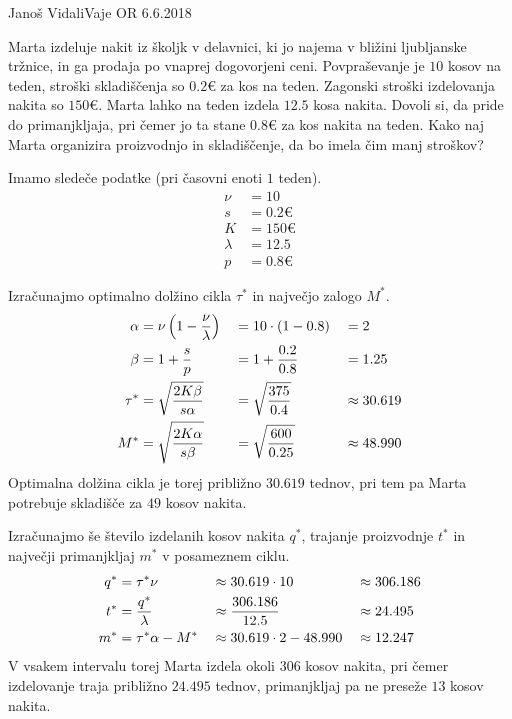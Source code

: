 \begin{naloga}{Janoš Vidali}{Vaje OR 6.6.2018}
\begin{vprasanje}
Marta izdeluje nakit iz školjk v delavnici,
ki jo najema v bližini ljubljanske tržnice,
in ga prodaja po vnaprej dogovorjeni ceni.
Povpraševanje je $10$ kosov na teden,
stroški skladiščenja so $0.2 €$ za kos na teden.
Zagonski stroški izdelovanja nakita so $150 €$.
Marta lahko na teden izdela $12.5$ kosa nakita.
Dovoli si, da pride do primanjkljaja,
pri čemer jo ta stane $0.8 €$ za kos nakita na teden.
Kako naj Marta organizira proizvodnjo in skladiščenje,
da bo imela čim manj stroškov?
\end{vprasanje}

\begin{odgovor}
Imamo sledeče podatke (pri časovni enoti $1$ teden).
\begin{align*}
\nu &= 10 \\
s &= 0.2 € \\
K &= 150 € \\
\lambda &= 12.5 \\
p &= 0.8 €
\end{align*}

Izračunajmo optimalno dolžino cikla $\tau^*$
in največjo zalogo $M^*$.
\begin{alignat*}{3}
\alpha &= \nu \left(1 - {\nu \over \lambda}\right)
&&= 10 \cdot (1 - 0.8) &&= 2 \\
\beta &= 1 + {s \over p}
&&= 1 + {0.2 \over 0.8} &&= 1.25 \\
\tau^* &= \sqrt{2K \beta \over s \alpha}
&&= \sqrt{375 \over 0.4} &&\approx 30.619 \\
M^* &= \sqrt{2K \alpha \over s \beta}
&&= \sqrt{600 \over 0.25} &&\approx 48.990
\end{alignat*}
Optimalna dolžina cikla je torej približno $30.619$ tednov,
pri tem pa Marta potrebuje skladišče za $49$ kosov nakita.

Izračunajmo še število izdelanih kosov nakita $q^*$,
trajanje proizvodnje $t^*$ in največji primanjkljaj $m^*$ v posameznem ciklu.
\begin{alignat*}{3}
q^* &= \tau^* \nu &&\approx 30.619 \cdot 10 &&\approx 306.186 \\
t^* &= {q^* \over \lambda} &&\approx {306.186 \over 12.5} &&\approx 24.495 \\
m^* &= \tau^* \alpha - M^* &&\approx 30.619 \cdot 2 - 48.990 &&\approx 12.247
\end{alignat*}
V vsakem intervalu torej Marta izdela okoli $306$ kosov nakita,
pri čemer izdelovanje traja približno $24.495$ tednov,
primanjkljaj pa ne preseže $13$ kosov nakita.
\end{odgovor}
\end{naloga}
